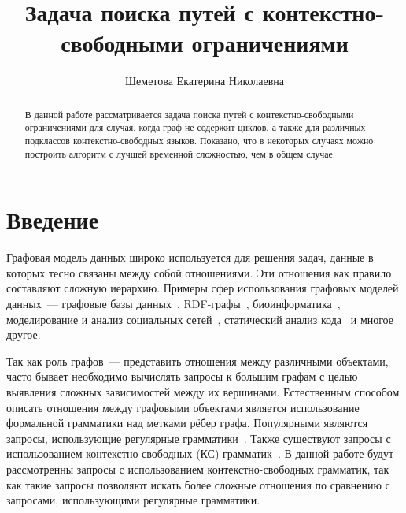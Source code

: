 \newtheorem{theoremrus}{Теорема}
\newtheorem{lemmarus}{Лемма}
\newtheorem{corollaryrus}{Следствие}

\title{Задача поиска путей с контекстно-свободными ограничениями}


\author{Шеметова Екатерина Николаевна}



\maketitle

\begin{abstract}
В данной работе рассматривается задача поиска путей с контекстно-свободными ограничениями для случая, когда граф не содержит циклов, а также для различных подклассов контекстно-свободных языков.
Показано, что в некоторых случаях можно построить алгоритм с лучшей временной сложностью, чем в общем случае.
\end{abstract}

\section*{Введение}
Графовая модель данных широко используется для решения
задач, данные в которых тесно связаны между собой
отношениями. Эти отношения как правило составляют сложную
иерархию. Примеры сфер использования графовых моделей
данных~--- графовые базы данных~\cite{GraphDB}, RDF-графы~\cite{RDF}, биоинформатика~\cite{Bio},
моделирование и анализ социальных сетей~\cite{social, Warcha2012UsingNG}, статический
анализ кода~\cite{Reps, DyckTrees, Static} и многое другое.

Так как роль графов~---
представить отношения между различными объектами,
часто бывает необходимо вычислять запросы к большим графам с целью
выявления сложных зависимостей между их вершинами. Естественным способом описать отношения
между графовыми объектами является использование
формальной грамматики над метками рёбер графа. Популярными являются запросы, использующие регулярные грамматики~\cite{Reg2, Reg1, Reg3}. Также существуют запросы с использованием
контекстно-свободных (КС) грамматик~\cite{MatrixMult, HellingsCFPQ, HellConj}. В данной работе будут рассмотренны запросы с использованием контекстно-свободных грамматик, так как такие запросы позволяют искать более сложные отношения по сравнению с запросами, использующими регулярные грамматики.

